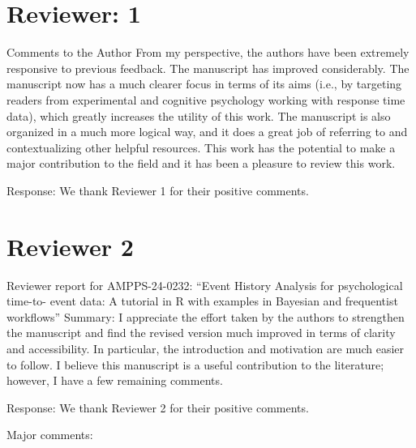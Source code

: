 \documentclass[
]{article}
\renewenvironment{quote}{\begin{leftbar}}{\end{leftbar}}
\begin{document}
\section{Reviewer: 1}\label{reviewer-1}

\begin{quote}
Comments to the Author From my perspective, the authors have been
extremely responsive to previous feedback. The manuscript has improved
considerably. The manuscript now has a much clearer focus in terms of
its aims (i.e., by targeting readers from experimental and cognitive
psychology working with response time data), which greatly increases the
utility of this work. The manuscript is also organized in a much more
logical way, and it does a great job of referring to and contextualizing
other helpful resources. This work has the potential to make a major
contribution to the field and it has been a pleasure to review this
work.
\end{quote}

Response: We thank Reviewer 1 for their positive comments.

\section{Reviewer 2}\label{reviewer-2}

\begin{quote}
Reviewer report for AMPPS-24-0232: ``Event History Analysis for
psychological time-to- event data: A tutorial in R with examples in
Bayesian and frequentist workflows'' Summary: I appreciate the effort
taken by the authors to strengthen the manuscript and find the revised
version much improved in terms of clarity and accessibility. In
particular, the introduction and motivation are much easier to follow. I
believe this manuscript is a useful contribution to the literature;
however, I have a few remaining comments.
\end{quote}

Response: We thank Reviewer 2 for their positive comments.

\begin{quote}
Major comments:
\end{quote}
\end{document}
